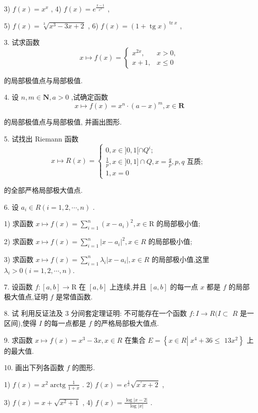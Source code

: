 3) $f\left( x\right)  = {x}^{x}$ , 4) $f\left( x\right)  = {e}^{\frac{x - 1}{{x}^{2}}}$ ,

5) $f\left( x\right)  = \sqrt[3]{{x}^{3} - {3x} + 2}$ , 6) $f\left( x\right)  = {\left( 1 + \operatorname{tg}x\right) }^{\operatorname{tr}x}$ ,

3. 试求函数
$$x \mapsto  f\left( x\right)  = \left\{  \begin{array}{ll} {x}^{2x}, & x > 0, \\  x + 1, & x \leq  0 \end{array}\right.$$

的局部极值点与局部极值.

4. 设 $n,m \in  \mathbf{N},a > 0$ ,试确定函数
$$x \mapsto  f\left( x\right)  = {x}^{n} \cdot  {\left( a - x\right) }^{m},x \in  \mathbf{R}$$

的局部极值点与局部极值, 并画出图形.

5. 试找出 Riemann 函数
$$x \mapsto  R\left( x\right)  = \left\{  \begin{array}{l} 0,x \in  \rbrack 0,1\lbrack  \cap  {Q}^{i}; \\  \frac{1}{p},x \in  \rbrack 0,1\rbrack  \cap  Q,x = \frac{q}{p},p,q\text{ 互质; } \\  1,x = 0 \end{array}\right.$$

的全部严格局部极大值点.

6. 设 ${a}_{i} \in  R\left( {i = 1,2,\cdots ,n}\right)$ .

1) 求函数 $x \mapsto  f\left( x\right)  = \mathop{\sum }\limits_{{i = 1}}^{n}{\left( x - {a}_{i}\right) }^{2},x \in  \mathrm{R}$ 的局部极小值;

2) 求函数 $x \mapsto  f\left( x\right)  = \mathop{\sum }\limits_{{i = 1}}^{n}{\left| x - {a}_{i}\right| }^{2},x \in  R$ 的局部极小值;

3) 求函数 $x \mapsto  f\left( x\right)  = \mathop{\sum }\limits_{{i = 1}}^{n}{\lambda }_{i}\left| {x - {a}_{i}}\right| ,x \in  R$ 的局部极小值,这里 ${\lambda }_{i} > 0\left( {i = 1,2,\cdots ,n}\right) .$

7. 设函数 $f : \left\lbrack  {a,b}\right\rbrack   \rightarrow  \mathrm{R}$ 在 $\left\lbrack  {a,b}\right\rbrack$ 上连续,并且 $\left\lbrack  {a,b}\right\rbrack$ 的每一点 $x$ 都是 $f$ 的局部极大值点,证明 $f$ 是常值函数.

8. 试 利用反证法及 3 分间套定理证明: 不可能存在一个函数 $f : I \rightarrow  R(I \subset$  $R$ 是一区间),使得 $I$ 的每一点都是 $f$ 的严格局部极大值点.

9. 求函数 $x \mapsto  f\left( x\right)  = {x}^{3} - {3x},x \in  R$ 在集合 $E = \left\{  {x \in  R\left| {\;{x}^{4} + {36} \leq  }\right. }\right.$  $\left. {{13}{x}^{2}}\right\}$ 上的最大值.

10. 画出下列各函数 $f$ 的图形.

1) $f\left( x\right)  = {x}^{2}\operatorname{arctg}\frac{1}{1 + x}$ . 2) $f\left( x\right)  = {e}^{\frac{1}{x}}\sqrt{{x}^{\prime }x + 2}$ ,

3) $f\left( x\right)  = x + \sqrt{{x}^{2} + 1}$ , 4) $f\left( x\right)  = \frac{\log \left| {x - 2}\right| }{\log \left| x\right| }$ .

